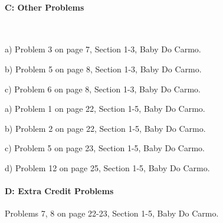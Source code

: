 \documentclass[12pt]{article}
\begin{document}
\paragraph{C: Other Problems}

\

\begin{itemize}
	{\item a) Problem 3 on page 7, Section 1-3, Baby Do Carmo.}
	{\item b) Problem 5 on page 8, Section 1-3, Baby Do Carmo.}
	{\item c) Problem 6 on page 8, Section 1-3, Baby Do Carmo.}
\end{itemize}


\begin{itemize}
	{\item a) Problem 1 on page 22, Section 1-5, Baby Do Carmo.}
	{\item b) Problem 2 on page 22, Section 1-5, Baby Do Carmo.}
	{\item c) Problem 5 on page 23, Section 1-5, Baby Do Carmo.}
	{\item d) Problem 12 on page 25, Section 1-5, Baby Do Carmo.}
\end{itemize}

\paragraph{D: Extra Credit Problems}
\begin{itemize}
	{\item Problems 7, 8  on page 22-23, Section 1-5, Baby Do Carmo.}
\end{itemize}
\end{document}
